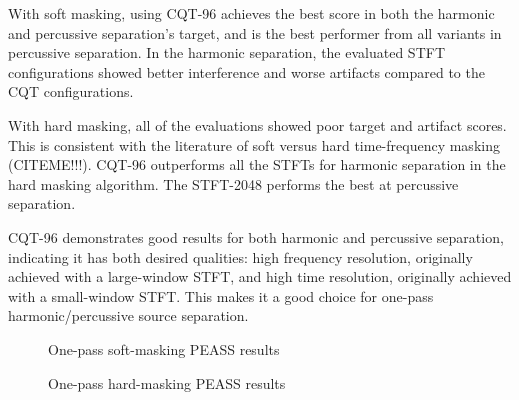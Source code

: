 \documentclass[10pt,letter]{article}
\begin{document}
With soft masking, using CQT-96 achieves the best score in both the harmonic and percussive separation's target, and is the best performer from all variants in percussive separation. In the harmonic separation, the evaluated STFT configurations showed better interference and worse artifacts compared to the CQT configurations.

With hard masking, all of the evaluations showed poor target and artifact scores. This is consistent with the literature of soft versus hard time-frequency masking (CITEME!!!). CQT-96 outperforms all the STFTs for harmonic separation in the hard masking algorithm. The STFT-2048 performs the best at percussive separation.

CQT-96 demonstrates good results for both harmonic and percussive separation, indicating it has both desired qualities: high frequency resolution, originally achieved with a large-window STFT, and high time resolution, originally achieved with a small-window STFT. This makes it a good choice for one-pass harmonic/percussive source separation.

\begin{figure}
	\centering
	\vspace{-1.25em}
	\caption{One-pass soft-masking PEASS results}
	\label{fig:round1soft}
\end{figure}

\begin{figure}
	\centering
	\vspace{-1.25em}
	\caption{One-pass hard-masking PEASS results}
	\label{fig:round1hard}
\end{figure}
\end{document}
